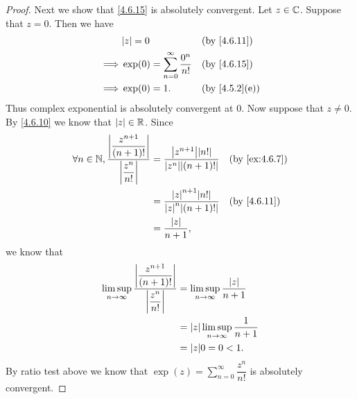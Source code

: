 \begin{proof}
  Next we show that \cref{4.6.15} is absolutely convergent.
  Let \(z \in \mathbb{C}\).
  Suppose that \(z = 0\).
  Then we have
  \begin{align*}
             & \abs{z} = 0                                   &  & \text{(by \cref{4.6.11})}   \\
    \implies & \exp(0) = \sum_{n = 0}^\infty \dfrac{0^n}{n!} &  & \text{(by \cref{4.6.15})}   \\
    \implies & \exp(0) = 1.                                  &  & \text{(by \cref{4.5.2}(e))}
  \end{align*}
  Thus complex exponential is absolutely convergent at \(0\).
  Now suppose that \(z \neq 0\).
  By \cref{4.6.10} we know that \(\left\lvert z\right\rvert \in \mathbb{R}\).
  Since
  \begin{align*}
    \forall n \in \N, \dfrac{\abs{\dfrac{z^{n + 1}}{(n + 1)!}}}{\abs{\dfrac{z^n}{n!}}} & = \dfrac{\abs{z^{n + 1}} \abs{n!}}{\abs{z^n} \abs{(n + 1)!}} &  & \text{(by \cref{ex:4.6.7})} \\
                                                                                       & = \dfrac{\abs{z}^{n + 1} \abs{n!}}{\abs{z}^n \abs{(n + 1)!}} &  & \text{(by \cref{4.6.11})}   \\
                                                                                       & = \dfrac{\abs{z}}{n + 1},
  \end{align*}
  we know that
  \begin{align*}
    \limsup_{n \to \infty} \dfrac{\abs{\dfrac{z^{n + 1}}{(n + 1)!}}}{\abs{\dfrac{z^n}{n!}}} & = \limsup_{n \to \infty} \dfrac{\abs{z}}{n + 1}   \\
                                                                                            & = \abs{z} \limsup_{n \to \infty} \dfrac{1}{n + 1} \\
                                                                                            & = \abs{z} 0 = 0 < 1.
  \end{align*}
  By ratio test above we know that \(\exp(z) = \sum_{n = 0}^\infty \dfrac{z^n}{n!}\) is absolutely convergent.


\end{proof}
